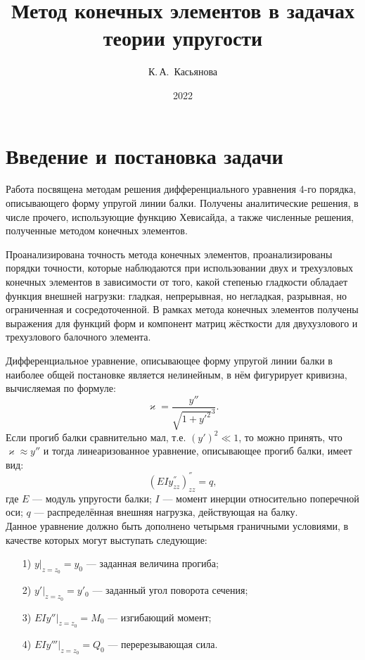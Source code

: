 \documentclass[12pt,a4paper]{article}
\title{Метод конечных элементов в задачах теории упругости}
\author{К.\,А.~Касьянова}
\date{2022}
\begin{document}
    \maketitle
	\tableofcontents
	\pagebreak

	\section{Введение и постановка задачи}
	Работа посвящена методам решения дифференциального уравнения 4-го порядка, описывающего форму упругой линии балки. Получены аналитические решения, в числе прочего, использующие функцию Хевисайда, а также численные решения, полученные методом конечных элементов.

	Проанализирована точность метода конечных элементов, проанализированы порядки точности, которые наблюдаются при использовании двух и трехузловых конечных элементов в зависимости от того, какой степенью гладкости обладает функция внешней нагрузки: гладкая, непрерывная, но негладкая, разрывная, но ограниченная и  сосредоточенной.  В рамках метода конечных элементов получены выражения для функций форм и компонент матриц жёсткости для двухузлового и трехузлового балочного элемента.

	Дифференциальное уравнение, описывающее форму упругой линии балки в наиболее общей постановке является нелинейным, в нём фигурирует кривизна, вычисляемая по формуле: 
	$$ \varkappa = \frac{y''}{\sqrt{1+y'^{2}}^{3}}.$$
	Если прогиб балки сравнительно мал, т.е. $(y')^{2} \ll 1$, то можно принять, что $\varkappa \approx y''$ и тогда линеаризованное уравнение, описывающее прогиб балки, имеет вид:
	\begin{equation}
	(EIy^{''}_{zz})^{''}_{zz}=q,
	\label{v1}
	\end{equation}
	где $E$ --- модуль упругости балки; $I$ --- момент инерции относительно поперечной оси; $q$ --- распределённая внешняя нагрузка, действующая на балку. \\
 
Данное уравнение должно быть дополнено четырьмя граничными условиями, в качестве которых могут выступать следующие: 
\begin{enumerate}
\item[1)] $y|_{z=z_{0}}=y_{0}$ --- заданная величина прогиба;
\item[2)] $y'|_{z=z_{0}}=y'_{0}$ --- заданный угол поворота сечения;
\item[3)] $EIy''|_{z=z_{0}}=M_{0}$ --- изгибающий момент;
\item[4)] $EIy'''|_{z=z_{0}}= Q_{0}$ --- перерезывающая сила.
\end{enumerate}
\end{document}
